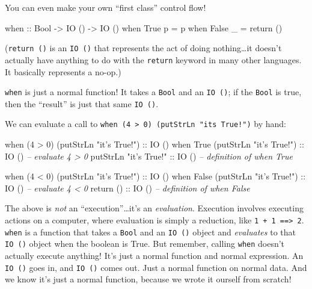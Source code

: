 \documentclass[]{article}
\newenvironment{Shaded}{}{}
\newcommand{\CommentTok}[1]{\textcolor[rgb]{0.38,0.63,0.69}{\textit{#1}}}
\newcommand{\DataTypeTok}[1]{\textcolor[rgb]{0.56,0.13,0.00}{#1}}
\newcommand{\DecValTok}[1]{\textcolor[rgb]{0.25,0.63,0.44}{#1}}
\newcommand{\FunctionTok}[1]{\textcolor[rgb]{0.02,0.16,0.49}{#1}}
\newcommand{\NormalTok}[1]{#1}
\newcommand{\OtherTok}[1]{\textcolor[rgb]{0.00,0.44,0.13}{#1}}
\newcommand{\StringTok}[1]{\textcolor[rgb]{0.25,0.44,0.63}{#1}}
\begin{document}
You can even make your own ``first class'' control flow!

\begin{Shaded}
\begin{Highlighting}[]
\OtherTok{when ::} \DataTypeTok{Bool} \OtherTok{->} \DataTypeTok{IO}\NormalTok{ () }\OtherTok{->} \DataTypeTok{IO}\NormalTok{ ()}
\NormalTok{when }\DataTypeTok{True}\NormalTok{  p }\FunctionTok{=}\NormalTok{ p}
\NormalTok{when }\DataTypeTok{False}\NormalTok{ _ }\FunctionTok{=}\NormalTok{ return ()}
\end{Highlighting}
\end{Shaded}

(\texttt{return\ ()} is an \texttt{IO\ ()} that represents the act of doing
nothing\ldots{}it doesn't actually have anything to do with the \texttt{return}
keyword in many other languages. It basically represents a no-op.)

\texttt{when} is just a normal function! It takes a \texttt{Bool} and an
\texttt{IO\ ()}; if the \texttt{Bool} is true, then the ``result'' is just that
same \texttt{IO\ ()}.

We can evaluate a call to
\texttt{when\ (4\ \textgreater{}\ 0)\ (putStrLn\ "it\textquotesingle{}s\ True!")}
by hand:

\begin{Shaded}
\begin{Highlighting}[]
\NormalTok{when (}\DecValTok{4} \FunctionTok{>} \DecValTok{0}\NormalTok{) (putStrLn }\StringTok{"it's True!"}\NormalTok{)}\OtherTok{ ::} \DataTypeTok{IO}\NormalTok{ ()}
\NormalTok{when }\DataTypeTok{True}\NormalTok{ (putStrLn }\StringTok{"it's True!"}\NormalTok{)}\OtherTok{    ::} \DataTypeTok{IO}\NormalTok{ ()  }\CommentTok{-- evaluate 4 > 0}
\NormalTok{putStrLn }\StringTok{"it's True!"}\OtherTok{                ::} \DataTypeTok{IO}\NormalTok{ ()  }\CommentTok{-- definition of when True}

\NormalTok{when (}\DecValTok{4} \FunctionTok{<} \DecValTok{0}\NormalTok{) (putStrLn }\StringTok{"it's True!"}\NormalTok{)}\OtherTok{ ::} \DataTypeTok{IO}\NormalTok{ ()}
\NormalTok{when }\DataTypeTok{False}\NormalTok{ (putStrLn }\StringTok{"it's True!"}\NormalTok{)}\OtherTok{   ::} \DataTypeTok{IO}\NormalTok{ ()  }\CommentTok{-- evaluate 4 < 0}
\NormalTok{return}\OtherTok{ ()                            ::} \DataTypeTok{IO}\NormalTok{ ()  }\CommentTok{-- definition of when False}
\end{Highlighting}
\end{Shaded}

The above is \emph{not} an ``execution''\ldots{}it's an \emph{evaluation}.
Execution involves executing actions on a computer, where evaluation is simply a
reduction, like \texttt{1\ +\ 1\ ==\textgreater{}\ 2}. \texttt{when} is a
function that takes a \texttt{Bool} and an \texttt{IO\ ()} object and
\emph{evaluates} to that \texttt{IO\ ()} object when the boolean is True. But
remember, calling \texttt{when} doesn't actually execute anything! It's just a
normal function and normal expression. An \texttt{IO\ ()} goes in, and
\texttt{IO\ ()} comes out. Just a normal function on normal data. And we know
it's just a normal function, because we wrote it ourself from scratch!
\end{document}
